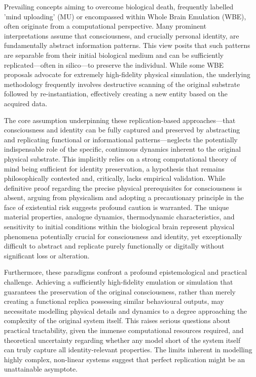 \documentclass[10pt]{article}
\begin{document}
\begin{sloppypar}
  Prevailing concepts aiming to overcome biological death, frequently labelled 'mind uploading' (MU) or encompassed within Whole Brain Emulation (WBE), often originate from a computational perspective. Many prominent interpretations assume that consciousness, and crucially personal identity, are fundamentally abstract information patterns. This view posits that such patterns are separable from their initial biological medium and can be sufficiently replicated—often in silico—to preserve the individual. While some WBE proposals advocate for extremely high-fidelity physical simulation, the underlying methodology frequently involves destructive scanning of the original substrate followed by re-instantiation, effectively creating a new entity based on the acquired data.

  The core assumption underpinning these replication-based approaches—that consciousness and identity can be fully captured and preserved by abstracting and replicating functional or informational patterns—neglects the potentially indispensable role of the specific, continuous dynamics inherent to the original physical substrate. This implicitly relies on a strong computational theory of mind being sufficient for identity preservation, a hypothesis that remains philosophically contested and, critically, lacks empirical validation. While definitive proof regarding the precise physical prerequisites for consciousness is absent, arguing from physicalism and adopting a precautionary principle in the face of existential risk suggests profound caution is warranted. The unique material properties, analogue dynamics, thermodynamic characteristics, and sensitivity to initial conditions within the biological brain represent physical phenomena potentially crucial for consciousness and identity, yet exceptionally difficult to abstract and replicate purely functionally or digitally without significant loss or alteration.

  Furthermore, these paradigms confront a profound epistemological and practical challenge. Achieving a sufficiently high-fidelity emulation or simulation that guarantees the preservation of the original consciousness, rather than merely creating a functional replica possessing similar behavioural outputs, may necessitate modelling physical details and dynamics to a degree approaching the complexity of the original system itself. This raises serious questions about practical tractability, given the immense computational resources required, and theoretical uncertainty regarding whether any model short of the system itself can truly capture all identity-relevant properties. The limits inherent in modelling highly complex, non-linear systems suggest that perfect replication might be an unattainable asymptote.


\end{sloppypar}
\end{document}
